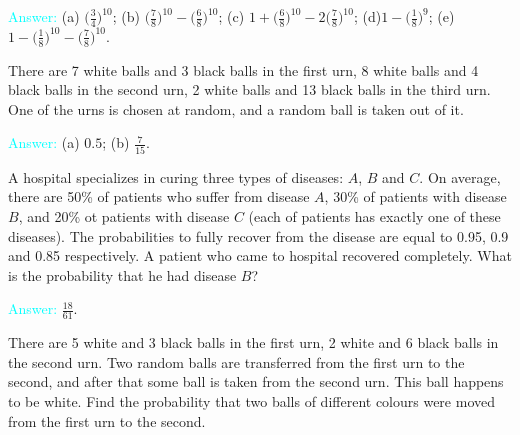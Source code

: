\documentclass[14pt]{exam}
\begin{document}
\begin{questions}
		
		\textcolor{cyan}{Answer:} (a) $\bigr(\frac{3}{4}\bigr)^{10}$; (b) $\bigr(\frac{7}{8}\bigr)^{10} - \bigr(\frac{6}{8}\bigr)^{10}$;
		(c) $1 + \bigr(\frac{6}{8}\bigr)^{10} - 2 \bigr(\frac{7}{8}\bigr)^{10}$; (d)$1 - \bigr(\frac{1}{8}\bigr)^{9}$; (e) $1 -  \bigr(\frac{1}{8}\bigr)^{10} - \bigr(\frac{7}{8}\bigr)^{10}$.
		
		\question
		There are 7 white balls and 3 black balls in the first urn, 8 white balls and 4 black balls in the second urn, 2 white balls and 13 black balls in the third urn. One of the urns is chosen at random, and a random ball is taken out of it.
		
		
		\textcolor{cyan}{Answer:} (a) $0.5$; (b) $\frac{7}{15}$.
		
		\question
		A hospital specializes in curing three types of diseases: $A$, $B$ and $C$. On average, there are 50\% of patients who suffer from disease $A$, 30\% of patients with disease $B$, and 20\% ot patients with disease $C$ (each of patients has exactly one of these diseases). The probabilities to fully recover from the disease are equal to 0.95, 0.9 and 0.85 respectively. A patient who came to hospital recovered completely. What is the probability that he had disease $B$?
		
		\textcolor{cyan}{Answer:} $\frac{18}{61}$.
		
		\question
		There are 5 white and 3 black balls in the first urn, 2 white and 6 black balls in the second urn. Two random balls are transferred from the first urn to the second, and after that some ball is taken from the second urn. This ball happens to be white. Find the probability that two balls of different colours were moved from the first urn to the second.
		

\end{questions}
\end{document}
